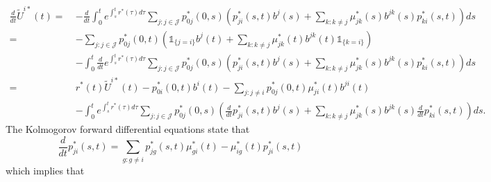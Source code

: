 \documentclass[12pt]{article}
\newcommand{\indic}[1]{\mathds{1}_{ \{ #1 \} }}
\theoremstyle{my_thm}
\theoremstyle{my_rem}
\begin{document}
\begin{align*}
\frac{d}{dt} \tilde{U}^{i*}(t)= \ & -\frac{d}{dt} 
\int_0^t e^{\int_s^t r^*(\tau) d\tau} \sum_{j:j \in \mathcal{J}} p^*_{0j}(0,s) \left(p^*_{ji}(s,t)   b^{j}(s) + \sum_{k:k \neq j}  \mu^*_{jk}(s) b^{jk}(s) p^*_{ki}(s,t) \right) ds
\\
= \ &
-\sum_{j:j \in \mathcal{J}} p^*_{0j}(0,t) \left( \indic{j=i}   b^{j}(t) + \sum_{k:k \neq j}  \mu^*_{jk}(t) b^{jk}(t) \indic{k=i}  \right) 
 \\
&-
\int_0^t \frac{d}{dt} e^{\int_s^t r^*(\tau) d\tau} \sum_{j:j \in \mathcal{J}} p^*_{0j}(0,s) \left(p^*_{ji}(s,t)   b^{j}(s) + \sum_{k:k \neq j}  \mu^*_{jk}(s) b^{jk}(s) p^*_{ki}(s,t) \right) ds\\
= \ &
r^*(t)\tilde{U}^{i*}(t)-p^*_{0i}(0,t) b^{i}(t) -\sum_{j:j \neq i} p^*_{0j}(0,t) \mu^*_{ji}(t) b^{ji}(t) 
\\
&-
\int_0^t e^{\int_s^t r^*(\tau) d\tau} \sum_{j:j \in \mathcal{J}} p^*_{0j}(0,s) \left( \frac{d}{dt}p^*_{ji}(s,t)   b^{j}(s) + \sum_{k:k \neq j}  \mu^*_{jk}(s) b^{jk}(s) \frac{d}{dt} p^*_{ki}(s,t) \right) ds.
\end{align*}
The Kolmogorov forward differential equations state that
$$
\frac{d}{dt}p^*_{ji}(s,t)=\sum_{g:g \neq i} p^*_{jg}(s,t)\mu^*_{gi}(t) - \mu^*_{ig}(t)p^*_{ji}(s,t)
$$
which implies that
\end{document}
